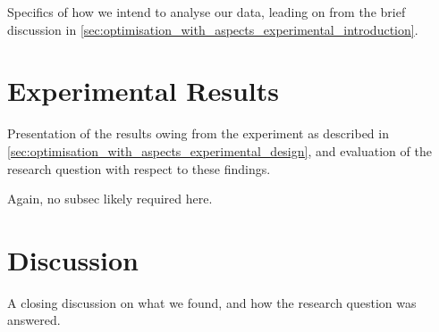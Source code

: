Specifics of how we intend to analyse our data, leading on from the brief
discussion in \cref{sec:optimisation_with_aspects_experimental_introduction}.



\section{Experimental Results}\label{sec:optimisation_with_aspects_experimental_results}

Presentation of the results owing from the experiment as described in
\cref{sec:optimisation_with_aspects_experimental_design}, and evaluation of the
research question with respect to these findings.

Again, no subsec likely required here.

\section{Discussion}\label{sec:optimisation_with_aspects_discussion}

A closing discussion on what we found, and how the research question was
answered.